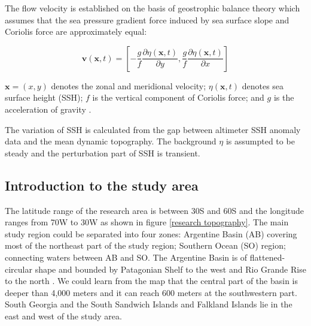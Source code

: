 

The flow velocity is established on the basis of geostrophic balance theory which assumes that the sea pressure gradient force induced by sea surface slope and Coriolis force are approximately equal:

\begin{equation}
\mathbf{v}(\mathbf{x}, t)=\left[-\frac{g}{f} \frac{\partial \eta(\mathbf{x}, t)}{\partial y}, \frac{g}{f} \frac{\partial \eta(\mathbf{x}, t)}{\partial x}\right] 
\end{equation}


$\mathbf{x}=(x, y)$ denotes the zonal and meridional velocity; $\eta(\mathbf{x}, t)$ denotes sea surface height (SSH); $f$ is the vertical component of Coriolis force; and $g$ is the acceleration of gravity \cite{beron2013objective}.

The variation of SSH is calculated from the gap between altimeter SSH anomaly data and the mean dynamic topography. The background $\eta$ is assumpted to be steady and the perturbation part of SSH is transient.

\subsection{Introduction to the study area}

The latitude range of the research area is between 30S and 60S and the longitude ranges from 70W to 30W as shown in figure \ref{research topography}. The main study region could be separated into four zones:  Argentine Basin (AB) covering most of the northeast part of the study region; Southern Ocean (SO) region; connecting waters between AB and SO. The Argentine Basin is of flattened-circular shape and bounded by Patagonian Shelf to the west and Rio Grande Rise to the north \cite{weijer2015eddy}. We could learn from the map that the central part of the basin is deeper than 4,000 meters and it can reach 600 meters at the southwestern part. South Georgia and the South Sandwich Islands and Falkland Islands lie in the east and west of the study area.

